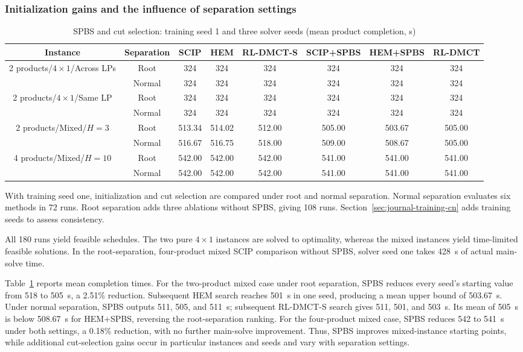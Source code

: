 \documentclass[final,5p,times,twocolumn]{elsarticle}
\newcounter{algorithm}
\begin{document}
\subsubsection{Initialization gains and the influence of separation settings}
\label{sec:journal-ablation-cn}


\begin{table}[!t]
\centering\small
\caption{SPBS and cut selection: training seed 1 and three solver seeds (mean product completion, s)}
\label{tab:journal-algorithm-cn}
\setlength{\tabcolsep}{3.5pt}
\begin{tabular}{cccccccc}\toprule
Instance & Separation & SCIP & HEM & RL-DMCT-S & SCIP+SPBS & HEM+SPBS & RL-DMCT\\\midrule
\multirow[c]{2}{*}{2 products/$4\times1$/Across LPs} & Root & 324 & 324 & 324 & 324 & 324 & 324\\
 & Normal & 324 & 324 & 324 & 324 & 324 & 324\\
\multirow[c]{2}{*}{2 products/$4\times1$/Same LP} & Root & 324 & 324 & 324 & 324 & 324 & 324\\
 & Normal & 324 & 324 & 324 & 324 & 324 & 324\\
\multirow[c]{2}{*}{2 products/Mixed/$H=3$} & Root & 513.34 & 514.02 & 512.00 & 505.00 & 503.67 & 505.00\\
 & Normal & 516.67 & 516.75 & 518.00 & 509.00 & 508.67 & 505.00\\
\multirow[c]{2}{*}{4 products/Mixed/$H=10$} & Root & 542.00 & 542.00 & 542.00 & 541.00 & 541.00 & 541.00\\
 & Normal & 542.00 & 542.00 & 542.00 & 541.00 & 541.00 & 541.00\\
\bottomrule\end{tabular}
\end{table}


With training seed one, initialization and cut selection are compared under root and normal separation. Normal separation evaluates six methods in 72 runs. Root separation adds three ablations without SPBS, giving 108 runs. Section~\ref{sec:journal-training-cn} adds training seeds to assess consistency.

All 180 runs yield feasible schedules. The two pure $4\times1$ instances are solved to optimality, whereas the mixed instances yield time-limited feasible solutions. In the root-separation, four-product mixed SCIP comparison without SPBS, solver seed one takes 428~s of actual main-solve time.

Table~\ref{tab:journal-algorithm-cn} reports mean completion times. For the two-product mixed case under root separation, SPBS reduces every seed's starting value from 518 to 505~s, a 2.51\% reduction. Subsequent HEM search reaches 501~s in one seed, producing a mean upper bound of 503.67~s. Under normal separation, SPBS outputs 511, 505, and 511~s; subsequent RL-DMCT-S search gives 511, 501, and 503~s. Its mean of 505~s is below 508.67~s for HEM+SPBS, reversing the root-separation ranking. For the four-product mixed case, SPBS reduces 542 to 541~s under both settings, a 0.18\% reduction, with no further main-solve improvement. Thus, SPBS improves mixed-instance starting points, while additional cut-selection gains occur in particular instances and seeds and vary with separation settings.
\end{document}
